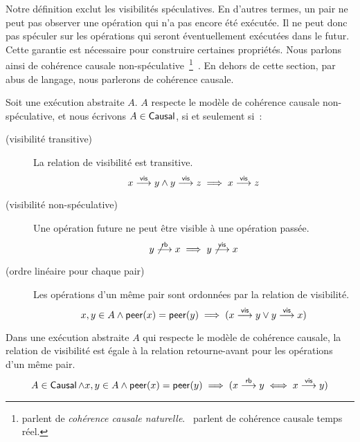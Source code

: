 Notre définition exclut les visibilités spéculatives.
En d'autres termes, un pair ne peut pas observer une opération qui n'a pas encore été exécutée.
Il ne peut donc pas spéculer sur les opérations qui seront éventuellement exécutées dans le futur.
Cette garantie est nécessaire pour construire certaines propriétés.
Nous parlons ainsi de cohérence causale non-spéculative~\footnote{\textcite{mahajan_2011_cac} parlent de \emph{cohérence causale naturelle}.~\textcite{viotti_consistency_2016} parlent de cohérence causale temps réel.}~\autocite{mahajan_2011_cac,viotti_consistency_2016}.
En dehors de cette section, par abus de langage, nous parlerons de cohérence causale.

\begin{definition}\label{def:causal-consistency}
  Soit une exécution abstraite $A$. $A$ respecte le modèle de cohérence causale non-spéculative, et nous écrivons $A \in \operatorname{\mathsf{Causal}}$, si et seulement si~:

  \begin{description}
  \item[ (visibilité transitive)]
  La relation de visibilité est transitive.
  \begin{equation*}
    x \overset{\mathsf{vis}}{\longrightarrow} y \land y \overset{\mathsf{vis}}{\longrightarrow} z \implies x \overset{\mathsf{vis}}{\longrightarrow} z
  \end{equation*}

  \item[ (visibilité non-spéculative)]
  Une opération future ne peut être visible à une opération passée.
  \begin{equation*}
    y \not\overset{\mathsf{rb}}{\longrightarrow} x \implies y \not\overset{\mathsf{vis}}{\longrightarrow} x
  \end{equation*}

  \item[ (ordre linéaire pour chaque pair)]
  Les opérations d'un même pair sont ordonnées par la relation de visibilité.
  \begin{equation*}
    x, y \in A \land \operatorname{\mathsf{peer}}(x) = \operatorname{\mathsf{peer}}(y) \implies
    (x \overset{\mathsf{vis}}{\longrightarrow} y \lor y \overset{\mathsf{vis}}{\longrightarrow} x)
  \end{equation*}
  \end{description}
\end{definition}

\begin{proposition}\label{th:rb-vis}
Dans une exécution abstraite $A$ qui respecte le modèle de cohérence causale, la relation de visibilité est égale à la relation retourne-avant pour les opérations d'un même pair.
\begin{equation*}
    A \in \operatorname{\mathsf{Causal}} \land x, y \in A \land \operatorname{\mathsf{peer}}(x) = \operatorname{\mathsf{peer}}(y) \implies (x \overset{\mathsf{rb}}{\longrightarrow} y \iff x \overset{\mathsf{vis}}{\longrightarrow} y)
\end{equation*}
\end{proposition}

